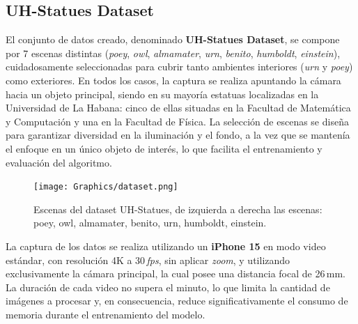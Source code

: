 \subsection{UH-Statues Dataset}

El conjunto de datos creado, denominado \textbf{UH-Statues Dataset}, se compone por 7 escenas distintas (\emph{poey}, \emph{owl}, \emph{almamater}, \emph{urn}, \emph{benito}, \emph{humboldt}, \emph{einstein}), cuidadosamente seleccionadas para cubrir tanto ambientes interiores (\emph{urn} y \emph{poey}) como exteriores. En todos los casos, la captura se realiza apuntando la cámara hacia un objeto principal, siendo en su mayoría estatuas localizadas en la Universidad de La Habana: cinco de ellas situadas en la Facultad de Matemática y Computación y una en la Facultad de Física. La selección de escenas se diseña para garantizar diversidad en la iluminación y el fondo, a la vez que se mantenía el enfoque en un único objeto de interés, lo que facilita el entrenamiento y evaluación del algoritmo.

\begin{figure}[htbp]
    \centering
    \texttt{[image: Graphics/dataset.png]}
    \caption{Escenas del dataset UH-Statues, de izquierda a derecha las escenas: poey, owl, almamater, benito, urn, humboldt, einstein.}
    \label{fig:dataset}
\end{figure}

La captura de los datos se realiza utilizando un \textbf{iPhone 15} en modo video estándar, con resolución 4K a 30\,\emph{fps}, sin aplicar \emph{zoom}, y utilizando exclusivamente la cámara principal, la cual posee una distancia focal de 26\,mm. La duración de cada video no supera el minuto, lo que limita la cantidad de imágenes a procesar y, en consecuencia, reduce significativamente el consumo de memoria durante el entrenamiento del modelo.

